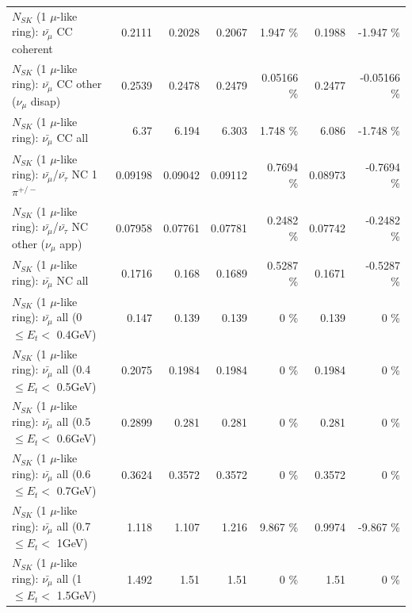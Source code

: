 \begin{table}
\begin{tabular}{| l | r | r | r  r | r  r |}
                       $N_{SK}$ (1 $\mu$-like ring): $\bar{\nu_\mu}$ CC coherent &          0.2111 &          0.2028 &          0.2067 &    1.947 \%  &          0.1988 &   -1.947 \%  \\ 
        $N_{SK}$ (1 $\mu$-like ring): $\bar{\nu_\mu}$ CC other ($\nu_\mu$ disap) &          0.2539 &          0.2478 &          0.2479 &  0.05166 \%  &          0.2477 & -0.05166 \%  \\ 
                          $N_{SK}$ (1 $\mu$-like ring): $\bar{\nu_{\mu}}$ CC all &            6.37 &           6.194 &           6.303 &    1.748 \%  &           6.086 &   -1.748 \%  \\ 
\hline
  $N_{SK}$ (1 $\mu$-like ring): $\bar{\nu_\mu}$/$\bar{\nu_\tau}$ NC 1$\pi^{+/-}$ &         0.09198 &         0.09042 &         0.09112 &   0.7694 \%  &         0.08973 &  -0.7694 \%  \\ 
$N_{SK}$ (1 $\mu$-like ring): $\bar{\nu_\mu}$/$\bar{\nu_\tau}$ NC other ($\nu_\mu$ app) &         0.07958 &         0.07761 &         0.07781 &   0.2482 \%  &         0.07742 &  -0.2482 \%  \\ 
                          $N_{SK}$ (1 $\mu$-like ring): $\bar{\nu_{\mu}}$ NC all &          0.1716 &           0.168 &          0.1689 &   0.5287 \%  &          0.1671 &  -0.5287 \%  \\ 
\hline
   $N_{SK}$ (1 $\mu$-like ring): $\bar{\nu_{\mu}}$ all (0 $\leq E_{t} <$ 0.4GeV) &           0.147 &           0.139 &           0.139 &        0 \%  &           0.139 &        0 \%  \\ 
 $N_{SK}$ (1 $\mu$-like ring): $\bar{\nu_{\mu}}$ all (0.4 $\leq E_{t} <$ 0.5GeV) &          0.2075 &          0.1984 &          0.1984 &        0 \%  &          0.1984 &        0 \%  \\ 
 $N_{SK}$ (1 $\mu$-like ring): $\bar{\nu_{\mu}}$ all (0.5 $\leq E_{t} <$ 0.6GeV) &          0.2899 &           0.281 &           0.281 &        0 \%  &           0.281 &        0 \%  \\ 
 $N_{SK}$ (1 $\mu$-like ring): $\bar{\nu_{\mu}}$ all (0.6 $\leq E_{t} <$ 0.7GeV) &          0.3624 &          0.3572 &          0.3572 &        0 \%  &          0.3572 &        0 \%  \\ 
   $N_{SK}$ (1 $\mu$-like ring): $\bar{\nu_{\mu}}$ all (0.7 $\leq E_{t} <$ 1GeV) &           1.118 &           1.107 &           1.216 &    9.867 \%  &          0.9974 &   -9.867 \%  \\ 
   $N_{SK}$ (1 $\mu$-like ring): $\bar{\nu_{\mu}}$ all (1 $\leq E_{t} <$ 1.5GeV) &           1.492 &            1.51 &            1.51 &        0 \%  &            1.51 &        0 \%  \\ 

\end{tabular}
\end{table}
